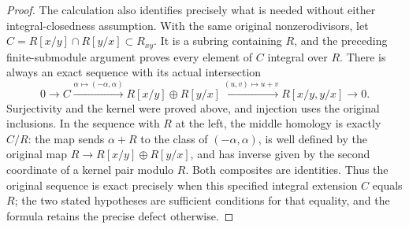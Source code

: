 \begin{proof}
The calculation also identifies precisely what is needed without
either integral-closedness assumption. With the same original
nonzerodivisors, let $C=R[x/y]\cap R[y/x]\subset R_{xy}$.
It is a subring containing $R$, and the preceding finite-submodule
argument proves every element of $C$ integral over $R$.
There is always an exact sequence with its actual intersection
$$
0\longrightarrow C\xrightarrow{\alpha\mapsto(-\alpha,\alpha)}
R[x/y]\oplus R[y/x]\xrightarrow{(u,v)\mapsto u+v}
R[x/y,y/x]\longrightarrow0.
$$
Surjectivity and the kernel were proved above, and injection uses
the original inclusions. In the sequence with $R$ at the left,
the middle homology is exactly $C/R$: the map sends
$\alpha+R$ to the class of $(-\alpha,\alpha)$, is well defined
by the original map $R\to R[x/y]\oplus R[y/x]$, and has inverse
given by the second coordinate of a kernel pair modulo $R$.
Both composites are identities. Thus the original sequence is
exact precisely when this specified integral extension $C$ equals
$R$; the two stated hypotheses are sufficient conditions for that
equality, and the formula retains the precise defect otherwise.
\end{proof}